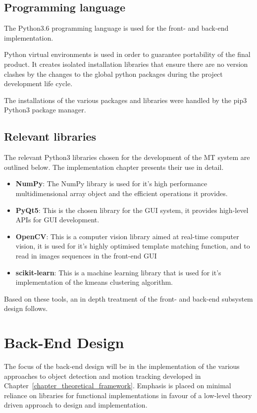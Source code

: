 \subsection{Programming language}
The Python3.6 programming language is used for the front- and
back-end implementation.

Python virtual environments is used in order to guarantee portability of the
final product. It creates isolated installation libraries that ensure there are
no version clashes by the changes to the global python packages during the
project development life cycle.

The installations of the various packages and libraries were handled by the pip3
Python3 package manager.

\subsection{Relevant libraries}
The relevant Python3 libraries chosen for the development of the MT system are
outlined below. The implementation chapter presents their use in detail.
\begin{itemize}
    \item \textbf{NumPy}: The NumPy library is used for it's high performance
        multidimensional array object and the efficient operations it provides.
    \item \textbf{PyQt5}: This is the chosen library for the GUI system, it
        provides high-level APIs for GUI development.     
    \item \textbf{OpenCV}: This is a computer vision library aimed at
        real-time computer vision, it is used for it's highly optimised template
        matching function, and to read in images sequences in the front-end GUI
    \item \textbf{scikit-learn}: This is a machine learning library that is
        used for it's implementation of the kmeans clustering algorithm.
\end{itemize}

Based on these tools, an in depth treatment of the front- and back-end subsystem
design follows. 

\section{Back-End Design}\label{design_back_end}
The focus of the back-end design will be in the implementation of the various
approaches to object detection and motion tracking developed in
Chapter~\ref{chapter_theoretical_framework}.
Emphasis is placed on minimal reliance on libraries for functional
implementations in favour of a low-level theory driven approach to design and
implementation.

